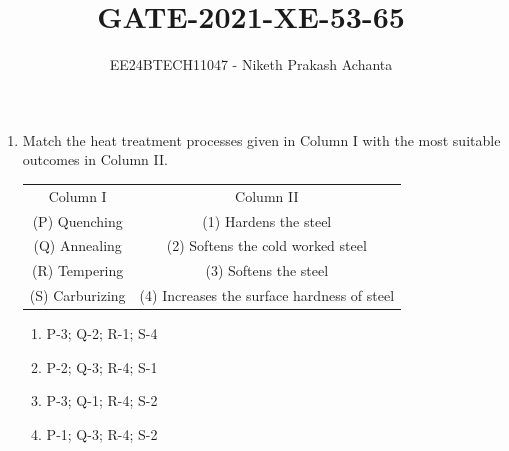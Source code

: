 \documentclass[journal]{IEEEtran}
\numberwithin{equation}{enumi}
\numberwithin{figure}{enumi}
\begin{document}


\title{GATE-2021-XE-53-65}
\author{EE24BTECH11047 - Niketh Prakash Achanta}
\maketitle

\begin{enumerate}[start=53]
    \item Match the heat treatment processes given in Column I with the most suitable outcomes in Column II. \\
    \begin{tabular}{c c}
        
        Column I & Column II \\
        
        (P) Quenching & (1) Hardens the steel \\
        (Q) Annealing & (2) Softens the cold worked steel \\
        (R) Tempering & (3) Softens the steel \\
        (S) Carburizing & (4) Increases the surface hardness of steel \\
        
    \end{tabular}
    
    \begin{enumerate}
        \item P-3; Q-2; R-1; S-4
        \item P-2; Q-3; R-4; S-1
        \item P-3; Q-1; R-4; S-2 
        \item P-1; Q-3; R-4; S-2
    \end{enumerate}


\end{enumerate}
\end{document}

